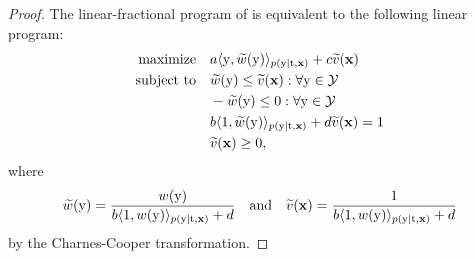 \begin{lemma}
\begin{proof}
        The linear-fractional program of  is equivalent to the following linear program:
        \begin{subequations}
            \begin{align}
                \text{maximize}\quad &a\langle \mathrm{y}, \widetilde{w}(\mathrm{y}) \rangle_{p(\mathrm{y} \mid \mathrm{t}, \mathbf{x})} + c \widetilde{v}(\mathbf{x}) \\
                \text{subject to}\quad &\widetilde{w}(\mathrm{y}) \leq \widetilde{v}(\mathbf{x}): \forall\mathrm{y} \in \mathcal{Y} \label{eq:p_cnstrnt}\\
                &-\widetilde{w}(\mathrm{y}) \leq 0: \forall\mathrm{y} \in \mathcal{Y} \label{eq:q_cnstrnt}\\
                & b\langle 1, \widetilde{w}(\mathrm{y}) \rangle_{p(\mathrm{y} \mid \mathrm{t}, \mathbf{x})} + d \widetilde{v}(\mathbf{x}) = 1 \label{eq:lambda_cnstrnt}\\
                & \widetilde{v}(\mathbf{x}) \geq 0,
            \end{align}
        \end{subequations}
        where
        \begin{equation*}
            \widetilde{w}(\mathrm{y}) = \frac{w(\mathrm{y})}{b\langle 1, w(\mathrm{y}) \rangle_{p(\mathrm{y} \mid \mathrm{t}, \mathbf{x})} + d} 
            \quad \text{and}
            \quad \widetilde{v}(\mathbf{x}) = \frac{1}{b\langle 1, w(\mathrm{y}) \rangle_{p(\mathrm{y} \mid \mathrm{t}, \mathbf{x})} + d}
        \end{equation*}
        by the Charnes-Cooper transformation.
        

\end{proof}
\end{lemma}
